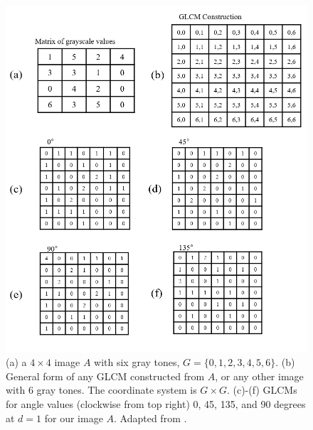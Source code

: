\documentclass{article}
\begin{document}
    \begin{figure}[t]
      \includegraphics[width=\linewidth]{matrix_fig.PNG}
      \caption{ (a) a $4 \times 4$ image $A$ with six gray tones, $G = \{0, 1, 2, 3, 4, 5, 6\}$. (b) General form of any GLCM constructed from $A$, or any other image with 6 gray tones. The coordinate system is $G \times G$. (c)-(f) GLCMs for angle values (clockwise from top right) 0, 45, 135, and 90 degrees at $d = 1$ for our image $A$.  Adapted from \cite{haralick}. }
      \label{fig:matrix}
    \end{figure}
\end{document}
